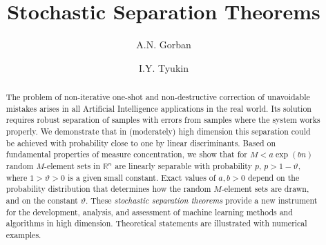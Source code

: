 \documentclass[final,5p,times,twocolumn]{elsarticle}
\begin{document}
\begin{frontmatter}



\title{Stochastic Separation Theorems}


\author[LeicMath]{A.N. Gorban}
\author[LeicMath,LETI]{I.Y. Tyukin}

\address[LeicMath]{Department of Mathematics, University of Leicester, Leicester, LE1 7RH, UK}
\address[LETI]{Department of Automation and Control Processes, Saint-Petersburg State Electrotechnical University, Saint-Petersburg, 197376, Russia}


\begin{abstract}

The problem of non-iterative one-shot and non-destructive correction of unavoidable mistakes arises in all Artificial Intelligence applications in the real world.  Its solution requires robust separation of samples with errors from samples where the system works properly. We demonstrate that in (moderately) high dimension this separation could be achieved with probability close to one by linear discriminants.  Based on fundamental properties of measure concentration, we show that for $M<a\exp(b{n})$  random $M$-element sets in $\mathbb{R}^n$ are linearly separable with probability $p$, $p>1-\vartheta$, where $1>\vartheta>0$ is a given small constant. Exact values of $a,b>0$ depend on the probability distribution that determines how the random $M$-element sets are drawn, and on the constant $\vartheta$. These {\em stochastic separation theorems} provide a new instrument
 for the development, analysis, and assessment of machine learning methods and algorithms in high dimension. Theoretical statements are illustrated with numerical examples.
\end{abstract}


\end{frontmatter}
\end{document}
